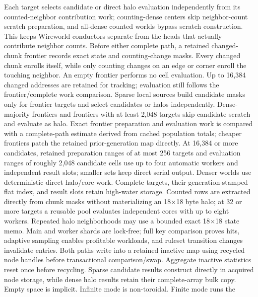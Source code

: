 \begin{itemize}
        Each target selects candidate or direct halo evaluation independently
        from its counted-neighbor contribution work; counting-dense centers skip
        neighbor-count scratch preparation, and all-dense counted worlds
        bypass scratch construction. This keeps Wireworld conductors separate
        from the heads that actually contribute neighbor counts. Before either
        complete path, a retained changed-chunk frontier records exact state
        and counting-change masks. Every changed chunk enrolls itself, while
        only counting changes on an edge or corner enroll the touching
        neighbor. An empty frontier performs no cell
        evaluation. Up to 16,384 changed addresses are retained for tracking;
        evaluation still follows the frontier/complete work comparison. Sparse local
        sources build candidate masks only for frontier targets and select
        candidates or halos independently. Dense-majority frontiers and
        frontiers with at least 2,048 targets skip candidate scratch and
        evaluate as halo. Exact frontier preparation and
        evaluation work is compared with a complete-path estimate derived from
        cached population totals; cheaper frontiers patch the retained
        prior-generation map directly. At 16,384 or more candidates, retained
        preparation ranges of at most 256 targets and evaluation ranges of
        roughly 2,048 candidate cells use up to four automatic workers and
        independent result slots; smaller sets keep direct serial
        output. Denser worlds use deterministic direct
        halo/core work. Complete targets, their generation-stamped flat index,
        and result slots retain high-water storage. Counted rows are extracted
        directly from chunk masks without materializing an 18$\times$18 byte
        halo; at 32 or more targets a reusable pool evaluates independent cores
        with up to eight workers. Repeated halo neighborhoods may use a bounded
        exact 18$\times$18 state memo. Main and worker shards are lock-free;
        full key comparison proves hits, adaptive sampling enables profitable
        workloads, and ruleset transition changes invalidate entries. Both
        paths write into a retained inactive map
        using recycled node handles before transactional comparison/swap.
        Aggregate inactive statistics reset once before recycling. Sparse
        candidate results construct directly in acquired node storage, while
        dense halo results retain their complete-array bulk copy. Empty
        space is implicit. Infinite mode is non-toroidal. Finite mode runs the

\end{itemize}
